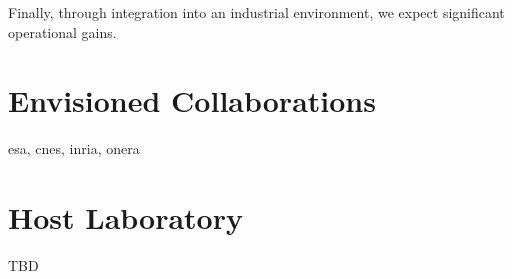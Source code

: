 \documentclass[12pt]{article}
\begin{document}
	Finally, through integration into an industrial environment, we expect significant operational gains.
	
	\nocite{*}
	
	\printbibliography[title=Indicative Bibliography]
	
	\section*{Envisioned Collaborations}
	
	\acrshort{esa}, \acrshort{cnes}, \acrshort{inria}, \acrshort{onera}
	
	\section*{Host Laboratory}
	
	TBD
	
	\printglossaries
	
\end{document}
